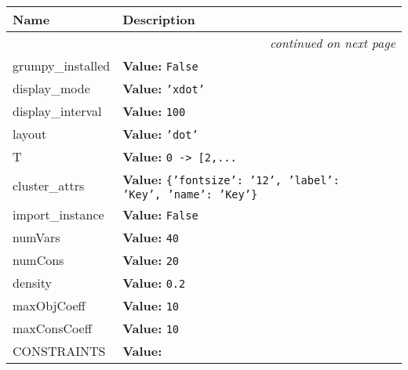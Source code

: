     \vspace{-1cm}
\hspace{\varindent}\begin{longtable}{|p{\varnamewidth}|p{\vardescrwidth}|l}
\cline{1-2}
\cline{1-2} \centering \textbf{Name} & \centering \textbf{Description}& \\
\cline{1-2}
\endhead\cline{1-2}\multicolumn{3}{r}{\small\textit{continued on next page}}\\\endfoot\cline{1-2}
\endlastfoot\raggedright g\-r\-u\-m\-p\-y\-\_\-i\-n\-s\-t\-a\-l\-l\-e\-d\- & \raggedright \textbf{Value:} 
{\tt False}&\\
\cline{1-2}
\raggedright d\-i\-s\-p\-l\-a\-y\-\_\-m\-o\-d\-e\- & \raggedright \textbf{Value:} 
{\tt \texttt{'}\texttt{xdot}\texttt{'}}&\\
\cline{1-2}
\raggedright d\-i\-s\-p\-l\-a\-y\-\_\-i\-n\-t\-e\-r\-v\-a\-l\- & \raggedright \textbf{Value:} 
{\tt 100}&\\
\cline{1-2}
\raggedright l\-a\-y\-o\-u\-t\- & \raggedright \textbf{Value:} 
{\tt \texttt{'}\texttt{dot}\texttt{'}}&\\
\cline{1-2}
\raggedright T\- & \raggedright \textbf{Value:} 
{\tt 0 -{\textgreater} [2,\texttt{...}}&\\
\cline{1-2}
\raggedright c\-l\-u\-s\-t\-e\-r\-\_\-a\-t\-t\-r\-s\- & \raggedright \textbf{Value:} 
{\tt \texttt{\{}\texttt{'}\texttt{fontsize}\texttt{'}\texttt{: }\texttt{'}\texttt{12}\texttt{'}\texttt{, }\texttt{'}\texttt{label}\texttt{'}\texttt{: }\texttt{'}\texttt{Key}\texttt{'}\texttt{, }\texttt{'}\texttt{name}\texttt{'}\texttt{: }\texttt{'}\texttt{Key}\texttt{'}\texttt{\}}}&\\
\cline{1-2}
\raggedright i\-m\-p\-o\-r\-t\-\_\-i\-n\-s\-t\-a\-n\-c\-e\- & \raggedright \textbf{Value:} 
{\tt False}&\\
\cline{1-2}
\raggedright n\-u\-m\-V\-a\-r\-s\- & \raggedright \textbf{Value:} 
{\tt 40}&\\
\cline{1-2}
\raggedright n\-u\-m\-C\-o\-n\-s\- & \raggedright \textbf{Value:} 
{\tt 20}&\\
\cline{1-2}
\raggedright d\-e\-n\-s\-i\-t\-y\- & \raggedright \textbf{Value:} 
{\tt 0.2}&\\
\cline{1-2}
\raggedright m\-a\-x\-O\-b\-j\-C\-o\-e\-f\-f\- & \raggedright \textbf{Value:} 
{\tt 10}&\\
\cline{1-2}
\raggedright m\-a\-x\-C\-o\-n\-s\-C\-o\-e\-f\-f\- & \raggedright \textbf{Value:} 
{\tt 10}&\\
\cline{1-2}
\raggedright C\-O\-N\-S\-T\-R\-A\-I\-N\-T\-S\- & \raggedright \textbf{Value:} 

\end{longtable}
